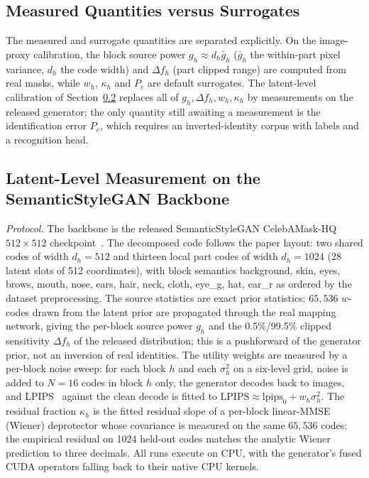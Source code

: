 \documentclass[10pt,twocolumn,letterpaper]{article}
\theoremstyle{plain}
\theoremstyle{definition}
\begin{document}
\subsection{Measured Quantities versus Surrogates}

The measured and surrogate quantities are separated explicitly. On the
image-proxy calibration, the block source power $g_h\approx d_h\bar g_h$
($\bar g_h$ the within-part pixel variance, $d_h$ the code width) and
$\Delta f_h$ (part clipped range) are computed from real masks, while $w_h$,
$\kappa_h$ and $P_e$ are default surrogates. The latent-level calibration of
Section~\ref{sec:latent} replaces all of $g_h,\Delta f_h,w_h,\kappa_h$ by
measurements on the released generator; the only quantity still awaiting a
measurement is the identification error $P_e$, which requires an
inverted-identity corpus with labels and a recognition head.

\subsection{Latent-Level Measurement on the SemanticStyleGAN Backbone}
\label{sec:latent}

\emph{Protocol.} The backbone is the released SemanticStyleGAN
CelebAMask-HQ $512{\times}512$ checkpoint~\cite{semanticstylegan,celebamaskhq}.
The decomposed code follows the paper layout: two shared codes of width
$d_h=512$ and thirteen local part codes of width $d_h=1024$ (28 latent slots
of 512 coordinates), with block semantics background, skin, eyes, brows,
mouth, nose, ears, hair, neck, cloth, eye\_g, hat, ear\_r as ordered by the
dataset preprocessing. The source statistics are exact prior statistics:
$65{,}536$ $w$-codes drawn from the latent prior are propagated through the
real mapping network, giving the per-block source power $g_h$ and the
0.5\%/99.5\% clipped sensitivity $\Delta f_h$ of the released distribution;
this is a pushforward of the generator prior, not an inversion of real
identities. The utility weights are measured by a per-block noise sweep: for
each block $h$ and each $\sigma_h^2$ on a six-level grid, noise is added to
$N=16$ codes in block $h$ only, the generator decodes back to images, and
LPIPS~\cite{lpips} against the clean decode is fitted to
$\mathrm{LPIPS}\approx\mathrm{lpips}_0+w_h\sigma_h^2$. The residual fraction
$\kappa_h$ is the fitted residual slope of a per-block linear-MMSE (Wiener)
deprotector whose covariance is measured on the same $65{,}536$ codes; the
empirical residual on 1024 held-out codes matches the analytic Wiener
prediction to three decimals. All runs execute on CPU, with the generator's
fused CUDA operators falling back to their native CPU kernels.
\end{document}
